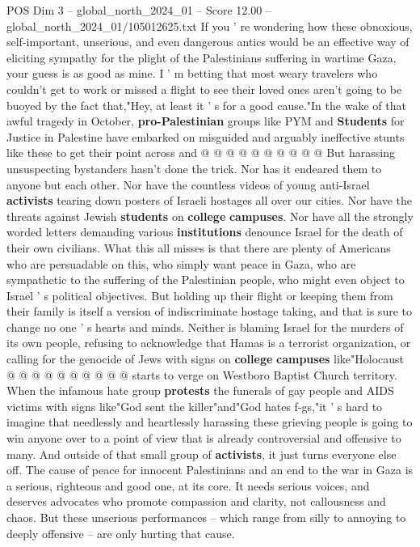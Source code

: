 \begin{textsample}{POS Dim 3 – global\_north\_2024\_01 – Score 12.00 – global\_north\_2024\_01/105012625.txt}
If you ' re wondering how these obnoxious, self-important, unserious, and even dangerous antics would be an effective way of eliciting sympathy for the plight of the Palestinians suffering in wartime Gaza, your guess is as good as mine.
I ' m betting that most weary travelers who couldn't get to work or missed a flight to see their loved ones aren't going to be buoyed by the fact that,"Hey, at least it ' s for a good cause."In the wake of that awful tragedy in October, \textbf{pro-Palestinian} groups like PYM and \textbf{Students} for Justice in Palestine have embarked on misguided and arguably ineffective stunts like these to get their point across and @ @ @ @ @ @ @ @ @ @ But harassing unsuspecting bystanders hasn't done the trick.
Nor has it endeared them to anyone but each other.
Nor have the countless videos of young anti-Israel \textbf{activists} tearing down posters of Israeli hostages all over our cities.
Nor have the threats against Jewish \textbf{students} on \textbf{college} \textbf{campuses}.
Nor have all the strongly worded letters demanding various \textbf{institutions} denounce Israel for the death of their own civilians.
What this all misses is that there are plenty of Americans who are persuadable on this, who simply want peace in Gaza, who are sympathetic to the suffering of the Palestinian people, who might even object to Israel ' s political objectives.
But holding up their flight or keeping them from their family is itself a version of indiscriminate hostage taking, and that is sure to change no one ' s hearts and minds.
Neither is blaming Israel for the murders of its own people, refusing to acknowledge that Hamas is a terrorist organization, or calling for the genocide of Jews with signs on \textbf{college} \textbf{campuses} like"Holocaust @ @ @ @ @ @ @ @ @ @ starts to verge on Westboro Baptist Church territory.
When the infamous hate group \textbf{protests} the funerals of gay people and AIDS victims with signs like"God sent the killer"and"God hates f-gs,"it ' s hard to imagine that needlessly and heartlessly harassing these grieving people is going to win anyone over to a point of view that is already controversial and offensive to many.
And outside of that small group of \textbf{activists}, it just turns everyone else off.
The cause of peace for innocent Palestinians and an end to the war in Gaza is a serious, righteous and good one, at its core.
It needs serious voices, and deserves advocates who promote compassion and clarity, not callousness and chaos.
But these unserious performances -- which range from silly to annoying to deeply offensive -- are only hurting that cause.

\end{textsample}
